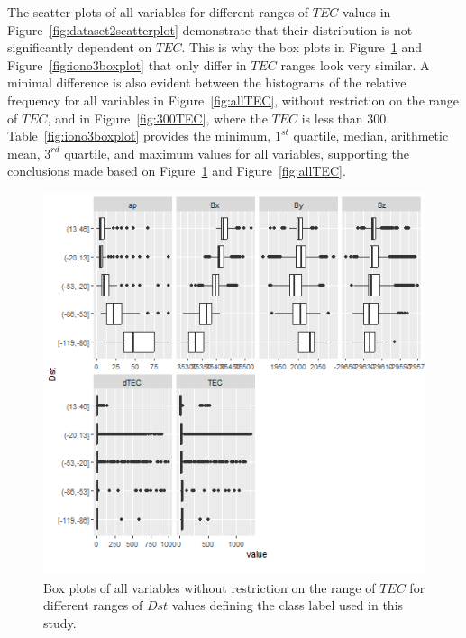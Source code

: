 \documentclass[sn-mathphys-num]{sn-jnl}%
\begin{document}
The scatter plots of all variables for different ranges of $TEC$ values in Figure~\ref{fig:dataset2scatterplot} demonstrate that their distribution is not significantly dependent on $TEC$. This is why the box plots in Figure~\ref{fig:dataset2boxplot} and Figure~\ref{fig:iono3boxplot} that only differ in $TEC$ ranges look very similar. A minimal difference is also evident between the histograms of the relative frequency for all variables in Figure~\ref{fig:allTEC}, without restriction on the range of $TEC$, and in Figure~\ref{fig:300TEC}, where the $TEC$ is less than $300$. Table~\ref{fig:iono3boxplot} provides the minimum, $1^{st}$ quartile, median, arithmetic mean, $3^{rd}$ quartile, and maximum values for all variables, supporting the conclusions made based on Figure~\ref{fig:dataset2boxplot} and Figure~\ref{fig:allTEC}.

\begin{figure}
    \centering
    \includegraphics[width=0.9\linewidth]{dataset2boxplot.png}
    \caption{Box plots of all variables without restriction on the range of $TEC$ for different ranges of $Dst$ values defining the class label used in this study.}
    \label{fig:dataset2boxplot}
\end{figure}
\end{document}
